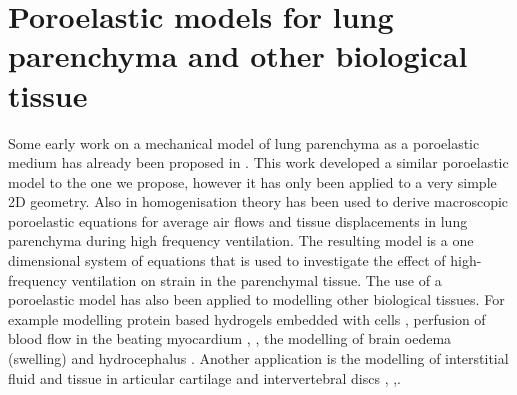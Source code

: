 \section{Poroelastic models for lung parenchyma and other biological tissue}
Some early work on a mechanical model of lung parenchyma as a poroelastic medium has already been proposed in \cite{kowalczyk1993mechanical}. This work developed a similar poroelastic model to the one we propose, however it has only been applied to a very simple 2D geometry. Also in \cite{owen2001mechanics} homogenisation theory has been used to derive macroscopic poroelastic equations for average air flows and tissue displacements in lung parenchyma during high frequency ventilation. The resulting model is a one dimensional system of equations that is used to investigate the effect of high-frequency ventilation on strain in the parenchymal tissue. The use of a poroelastic model has also been applied to modelling other biological tissues. For example modelling protein based hydrogels embedded with cells \cite{galie2011linear}, perfusion of blood flow in the beating myocardium \cite{chapelle2010poroelastic}, \cite{cookson2011novel}, the modelling of brain oedema (swelling) \cite{li2010three} and hydrocephalus \cite{wirth2006axisymmetric}. Another application is the modelling of interstitial fluid and tissue in articular cartilage and intervertebral discs \cite{mow1980biphasic}, \cite{holmes1990nonlinear},\cite{galbusera2011comparison}.




